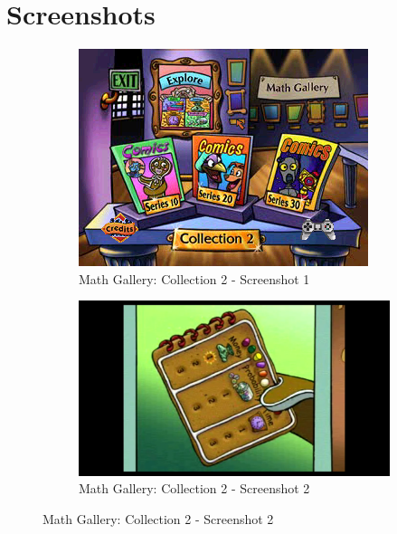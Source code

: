 \clearpage
\newpage

\section{Screenshots}

\begin{figure}[H]
    \centering
    \begin{subfigure}{0.45\textwidth}
        \centering
        \includegraphics[width=\linewidth]{Games/MathGalleryCollection/Images/MathGalleryCollection2Image1.png}
        \caption{Math Gallery: Collection 2 - Screenshot 1}
    \end{subfigure}
    \begin{subfigure}{0.45\textwidth}
        \includegraphics[width=\linewidth]{Games/MathGalleryCollection/Images/MathGalleryCollection2Image2.png}
        \caption{Math Gallery: Collection 2 - Screenshot 2}
    \end{subfigure}


\end{figure}
